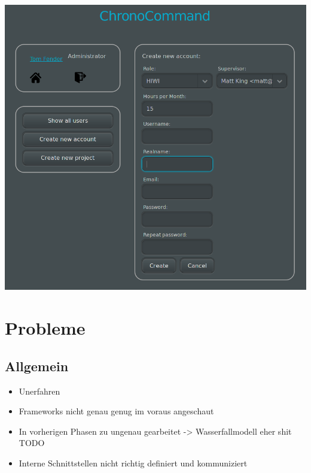 \begin{frame}
	\begin{center}
		\includegraphics[width=\linewidth,height=0.9\textheight,keepaspectratio]{images/create-user.png}
	\end{center}
\end{frame}


\section{Probleme}

\subsection{Allgemein}
\begin{frame}
	\begin{itemize}
		\item Unerfahren
		\item Frameworks nicht genau genug im voraus angeschaut
		\item In vorherigen Phasen zu ungenau gearbeitet
		-> Wasserfallmodell eher shit TODO
		\item Interne Schnittstellen nicht richtig definiert und kommuniziert
	\end{itemize}
\end{frame}

